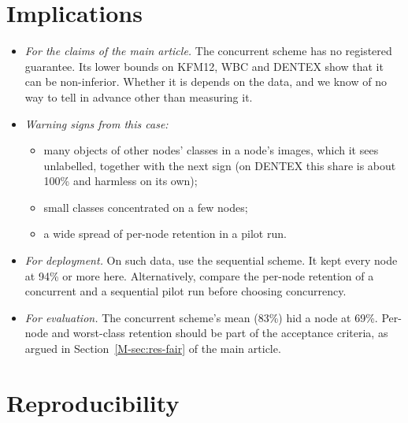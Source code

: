 \documentclass[pdflatex,sn-mathphys-num]{sn-jnl}
\begin{document}
\section{Implications}\label{sec:s-implications}

\begin{itemize}
\item \emph{For the claims of the main article.} The concurrent scheme has no registered guarantee. Its lower bounds on KFM12, WBC and DENTEX show that it can be non-inferior. Whether it is depends on the data, and we know of no way to tell in advance other than measuring it.
\item \emph{Warning signs from this case:}
  \begin{itemize}
  \item many objects of other nodes' classes in a node's images, which it sees unlabelled, together with the next sign (on DENTEX this share is about 100\% and harmless on its own);
  \item small classes concentrated on a few nodes;
  \item a wide spread of per-node retention in a pilot run.
  \end{itemize}
\item \emph{For deployment.} On such data, use the sequential scheme. It kept every node at 94\% or more here. Alternatively, compare the per-node retention of a concurrent and a sequential pilot run before choosing concurrency.
\item \emph{For evaluation.} The concurrent scheme's mean (83\%) hid a node at 69\%. Per-node and worst-class retention should be part of the acceptance criteria, as argued in Section~\ref{M-sec:res-fair} of the main article.
\end{itemize}

\section{Reproducibility}\label{sec:s-repro}
\end{document}
